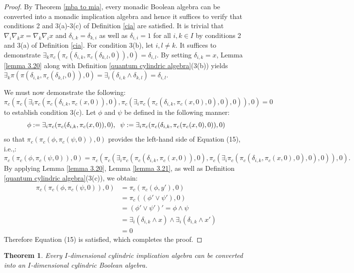 \documentclass[reqno]{amsart}
\theoremstyle{plain}
\newtheorem{theorem}{Theorem}[section]
\theoremstyle{definition}
\begin{document}
\begin{proof}
    By Theorem \ref{mba to mia}, every monadic Boolean algebra can be converted into a monadic implication algebra and hence it suffices to verify that conditions 2 and 3(a)-3(c) of Definition \ref{cia} are satisfied. It is trivial that $\nabla_i\nabla_kx=\nabla_k\nabla_ix$ and $\delta_{i,k}=\delta_{k,i}$ as well as $\delta_{i,i}=1$ for all $i,k\in I$ by conditions 2 and 3(a) of Definition \ref{cia}. For condition 3(b), let $i,l\not=k$. It suffices to demonstrate $\exists_k\pi_c(\pi_c(\delta_{i,k},\pi_c(\delta_{k,l},0)),0)=\delta_{i,l}$. By setting $\delta_{i,k}=x$, Lemma \ref{lemma 3.20} along with Definition \ref{quantum cylindric algebra}(3(b)) yields $\exists_k\pi(\pi(\delta_{i,k},\pi_c(\delta_{k,l},0)),0)=\exists_i(\delta_{i,k}\wedge\delta_{k,l})=\delta_{i,l}$.
    
    
    We must now demonstrate the following: 
\begin{equation}
    \pi_c(\pi_c(\exists_i\pi_c(\pi_c(\delta_{i,k},\pi_c(x,0)),0),\pi_c(\exists_i\pi_c(\pi_c(\delta_{i,k},\pi_c(x,0),0),0),0)),0)=0
\end{equation}
to establish condition 3(c). Let $\phi$ and $\psi$ be defined in the following manner: \[\phi:=\exists_i\pi_c(\pi_c(\delta_{i,k},\pi_c(x,0)),0), \hspace{.2cm}\psi:=\exists_i\pi_c(\pi_c(\delta_{i,k},\pi_c(\pi_c(x,0),0)),0)\]  so that $\pi_c(\pi_c(\phi,\pi_c(\psi,0)),0)$ provides the left-hand side of Equation (15), i.e.,:  
\[\pi_c(\pi_c(\phi,\pi_c(\psi,0)),0)=\pi_c(\pi_c(\exists_i\pi_c(\pi_c(\delta_{i,k},\pi_c(x,0)),0),\pi_c(\exists_i\pi_c(\pi_c(\delta_{i,k},\pi_c(x,0),0),0),0)),0).\]
By applying Lemma \ref{lemma 3.20}, Lemma \ref{lemma 3.21}, as well as Definition \ref{quantum cylindric algebra}(3(c)), we obtain: 
\begin{align*}
    \pi_c(\pi_c(\phi,\pi_c(\psi,0)),0)&=\pi_c(\pi_c(\phi,y'),0)\\&=\pi_c((\phi'\vee\psi'),0)\\&=(\phi'\vee\psi')'=\phi\wedge\psi\\&=\exists_i(\delta_{i,k}\wedge x)\wedge\exists_i(\delta_{i,k}\wedge x')\\&=0
\end{align*}
Therefore Equation (15) is satisfied, which completes the proof. 
\end{proof}
\begin{theorem}\label{cia to cba}
    Every $I$-dimensional cylindric implication algebra can be converted into an $I$-dimensional cylindric Boolean algebra. 
\end{theorem}
\end{document}
